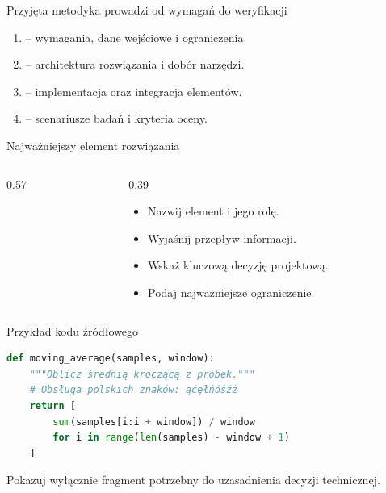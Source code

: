 \begin{frame}{Przyjęta metodyka prowadzi od wymagań do weryfikacji}
  \begin{enumerate}
    \item {} -- wymagania, dane wejściowe i ograniczenia.
    \item {} -- architektura rozwiązania i dobór narzędzi.
    \item {} -- implementacja oraz integracja elementów.
    \item {} -- scenariusze badań i kryteria oceny.
  \end{enumerate}
  \vspace{5mm}
\end{frame}

\begin{frame}{Najważniejszy element rozwiązania}
  \begin{columns}[T,onlytextwidth]
    \begin{column}{0.57\textwidth}
    \end{column}
    \begin{column}{0.39\textwidth}
      \begin{itemize}
        \item Nazwij element i jego rolę.
        \item Wyjaśnij przepływ informacji.
        \item Wskaż kluczową decyzję projektową.
        \item Podaj najważniejsze ograniczenie.
      \end{itemize}
    \end{column}
  \end{columns}
\end{frame}

\begin{frame}[fragile]{Przykład kodu źródłowego}
\begin{lstlisting}[style=weail,language=Python]
def moving_average(samples, window):
    """Oblicz średnią kroczącą z próbek."""
    # Obsługa polskich znaków: ąćęłńóśźż
    return [
        sum(samples[i:i + window]) / window
        for i in range(len(samples) - window + 1)
    ]
\end{lstlisting}
  \vspace{2mm}
  \small Pokazuj wyłącznie fragment potrzebny do uzasadnienia decyzji technicznej.
\end{frame}
